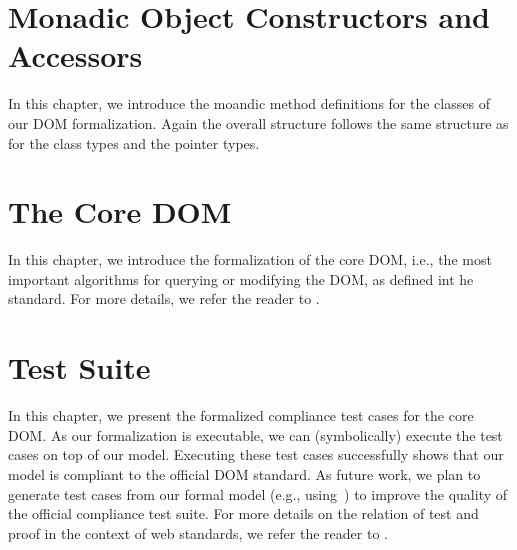 \documentclass[10pt,DIV16,a4paper,abstract=true,twoside=semi,openright]
{scrreprt}
\begin{document}
\chapter{Monadic Object Constructors and Accessors}
\label{cha:monads}
In this chapter, we introduce the moandic method definitions for the
classes of our DOM formalization. Again the overall structure follows
the same structure as for the class types and the pointer types.







\chapter{The Core DOM}
\label{cha:dom}
In this chapter, we introduce the formalization of the core DOM, i.e.,
the most important algorithms for querying or modifying the DOM, as
defined int he standard. For more details, we refer the reader to
\cite{brucker.ea:core-dom:2018}.





\chapter{Test Suite}
\label{cha:tests}
In this chapter, we present the formalized compliance test cases for
the core DOM. As our formalization is executable, we can
(symbolically) execute the test cases on top of our model. Executing
these test cases successfully shows that our model is compliant to the
official DOM standard. As future work, we plan to generate test cases
from our formal model (e.g.,
using~\cite{brucker.ea:interactive:2005,brucker.ea:theorem-prover:2012})
to improve the quality of the official compliance test suite. For more
details on the relation of test and proof in the context of web
standards, we refer the reader to
\cite{brucker.ea:standard-compliance-testing:2018}.
 
 
 

{\small
  
  
}
\end{document}
